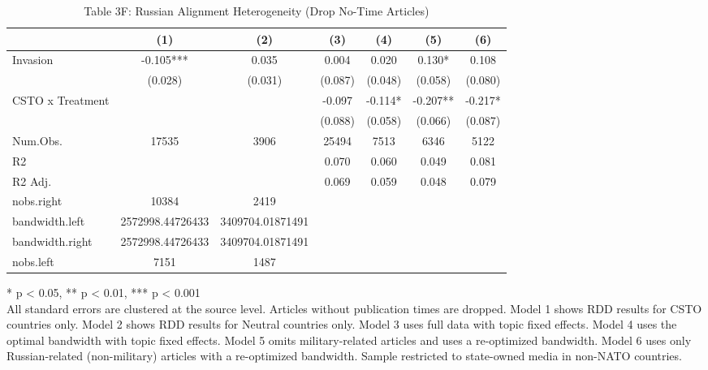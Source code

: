 \begin{table}[!t]
\caption{Table 3F: Russian Alignment Heterogeneity (Drop No-Time Articles)} 
\fontsize{12.0pt}{14.4pt}\selectfont
\begin{tabular*}{\linewidth}{@{\extracolsep{\fill}}lcccccc}
\toprule
  & (1) & (2) & (3) & (4) & (5) & (6) \\ 
\midrule\addlinespace[2.5pt]
Invasion & -0.105*** & 0.035 & 0.004 & 0.020 & 0.130* & 0.108 \\ 
 & (0.028) & (0.031) & (0.087) & (0.048) & (0.058) & (0.080) \\ 
CSTO x Treatment &  &  & -0.097 & -0.114* & -0.207** & -0.217* \\ 
{} & {} & {} & {(0.088)} & {(0.058)} & {(0.066)} & {(0.087)} \\ 
Num.Obs. & 17535 & 3906 & 25494 & 7513 & 6346 & 5122 \\ 
R2 &  &  & 0.070 & 0.060 & 0.049 & 0.081 \\ 
R2 Adj. &  &  & 0.069 & 0.059 & 0.048 & 0.079 \\ 
nobs.right & 10384 & 2419 &  &  &  &  \\ 
bandwidth.left & 2572998.44726433 & 3409704.01871491 &  &  &  &  \\ 
bandwidth.right & 2572998.44726433 & 3409704.01871491 &  &  &  &  \\ 
nobs.left & 7151 & 1487 &  &  &  &  \\ 
\bottomrule
\end{tabular*}
\begin{minipage}{\linewidth}
* p < 0.05, ** p < 0.01, *** p < 0.001\\
All standard errors are clustered at the source level. Articles without
publication times are dropped. Model 1 shows RDD results for CSTO countries
only. Model 2 shows RDD results for Neutral countries only. Model 3 uses full
data with topic fixed effects. Model 4 uses the optimal bandwidth with topic
fixed effects. Model 5 omits military-related articles and uses a re-optimized
bandwidth. Model 6 uses only Russian-related (non-military) articles with a
re-optimized bandwidth. Sample restricted to state-owned media in non-NATO
countries.\\
\end{minipage}
\end{table}

